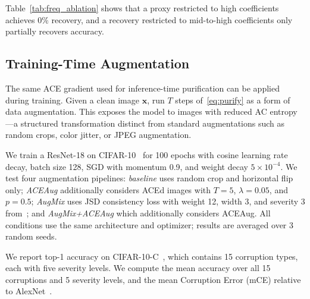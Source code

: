 \documentclass{article}
\theoremstyle{definition}
\newcommand{\bx}{\boldsymbol{x}}
\begin{document}
Table~\ref{tab:freq_ablation} shows that a proxy restricted to high coefficients achieves $0\%$ recovery, and a recovery restricted to mid-to-high coefficients only partially recovers accuracy. 

\subsection{Training-Time Augmentation}
\label{sec:aug}

The same ACE gradient used for inference-time purification can be applied during training.
Given a clean image $\bx$, run $T$ steps of~\eqref{eq:purify} as a form of data augmentation.
This exposes the model to images with reduced AC entropy---a structured transformation distinct from standard augmentations such as random crops, color jitter, or JPEG augmentation.

We train a ResNet-18 on CIFAR-10~\citep{krizhevsky2009learning} for 100 epochs with cosine learning rate decay, batch size 128, SGD with momentum 0.9, and weight decay $5\times10^{-4}$.
We test four augmentation pipelines: \emph{baseline} uses random crop and horizontal flip only; \emph{ACEAug} additionally considers ACEd images with $T=5$, $\lambda=0.05$, and $p=0.5$; \emph{AugMix} uses JSD consistency loss with weight 12, width 3, and severity 3 from~\citet{hendrycks2020augmix}; and \emph{AugMix+ACEAug} which additionally considers ACEAug.
All conditions use the same architecture and optimizer; results are averaged over 3 random seeds.

We report top-1 accuracy on CIFAR-10-C~\citep{hendrycks2019benchmarking}, which contains 15 corruption types, each with five severity levels.
We compute the mean accuracy over all 15 corruptions and 5 severity levels, and the mean Corruption Error (mCE) relative to AlexNet~\citep{krizhevsky2012imagenet}.
\end{document}

